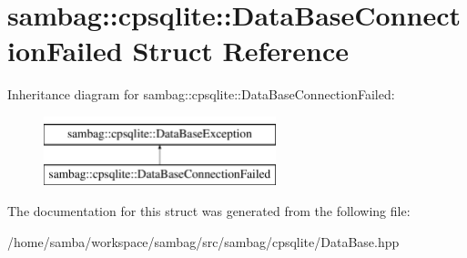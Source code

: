 \hypertarget{structsambag_1_1cpsqlite_1_1_data_base_connection_failed}{
\section{sambag::cpsqlite::DataBaseConnectionFailed Struct Reference}
\label{structsambag_1_1cpsqlite_1_1_data_base_connection_failed}
}
Inheritance diagram for sambag::cpsqlite::DataBaseConnectionFailed:\begin{figure}[H]
\begin{center}
\leavevmode
\includegraphics[height=2.000000cm]{structsambag_1_1cpsqlite_1_1_data_base_connection_failed}
\end{center}
\end{figure}


The documentation for this struct was generated from the following file:\begin{DoxyCompactItemize}
\item 
/home/samba/workspace/sambag/src/sambag/cpsqlite/DataBase.hpp\end{DoxyCompactItemize}
